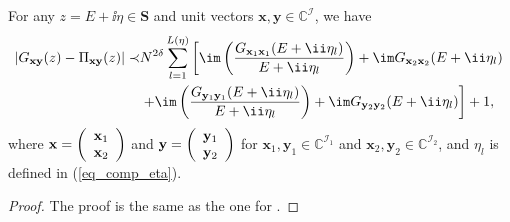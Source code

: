 \begin{lemma}\label{lemm_comp_1}
For any $z=E+\ii\eta\in\mathbf S$ and unit vectors $\mathbf x,\mathbf y\in \mathbb C^{\mathcal I}$,  we have %
\begin{align*}
\left|G_{\mathbf x\mathbf y}(z)-\Pi_{\mathbf x\mathbf y}(z)\right|\prec & N^{2\delta}\sum_{l=1}^{L(\eta)} \left[\im \left(\frac{G_{\mathbf x_1\mathbf x_1}(E+\ii\eta_l)}{E+\ii\eta_l}\right)+\im G_{\mathbf x_2\mathbf x_2}(E+\ii\eta_l) \right.\\
& \left. +\im \left(\frac{G_{\mathbf y_1\mathbf y_1}(E+\ii\eta_l)}{E+\ii\eta_l}\right)+\im G_{\mathbf y_2\mathbf y_2}(E+\ii\eta_l)\right]+1,
\end{align*}
where $\mathbf x=\left( {\begin{array}{*{20}c}
   {\mathbf x}_1   \\
   {\mathbf x}_2 \\
   \end{array}} \right)$ and $\mathbf y=\left( {\begin{array}{*{20}c}
   {\mathbf y}_1   \\
   {\mathbf y}_2 \\
   \end{array}} \right)$ for ${\mathbf x}_1,{\mathbf y}_1\in\mathbb C^{\mathcal I_1}$ and ${\mathbf x}_2,{\mathbf y}_2\in\mathbb C^{\mathcal I_2}$, and $\eta_l$ is defined in (\ref{eq_comp_eta}).
\end{lemma}
\begin{proof} The proof is the same as the one for \cite[Lemma 7.12]{Anisotropic}.\end{proof}
